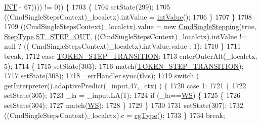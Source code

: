 \begin{DoxyCode}
      \hyperlink{classgov_1_1nasa_1_1jpf_1_1inspector_1_1client_1_1parser_1_1_console_grammar_parser_abd77a1befc3eca91ef4ffb5856126df5}{INT} - 67)))) != 0)) \{
1703           \{
1704           setState(299);
1705           ((CmdSingleStepsContext)\_localctx).intValue = \hyperlink{classgov_1_1nasa_1_1jpf_1_1inspector_1_1client_1_1parser_1_1_console_grammar_parser_a132b5d5236398d90d8d1e6b16dc0bd20}{intValue}();
1706           \}
1707         \}
1708 
1709          ((CmdSingleStepsContext)\_localctx).value =  \textcolor{keyword}{new} \hyperlink{classgov_1_1nasa_1_1jpf_1_1inspector_1_1client_1_1commands_1_1_cmd_single_stepping}{CmdSingleStepping}(\textcolor{keyword}{true}, 
      \hyperlink{enumgov_1_1nasa_1_1jpf_1_1inspector_1_1interfaces_1_1_commands_interface_1_1_step_type}{StepType}.\hyperlink{enumgov_1_1nasa_1_1jpf_1_1inspector_1_1interfaces_1_1_commands_interface_1_1_step_type_aa1a566d7ef680bc49ccaa4f710384a7b}{ST\_STEP\_OUT},      ((CmdSingleStepsContext)\_localctx).intValue != null ? ((
      CmdSingleStepsContext)\_localctx).intValue.value : 1); 
1710         \}
1711         \textcolor{keywordflow}{break};
1712       \textcolor{keywordflow}{case} \hyperlink{classgov_1_1nasa_1_1jpf_1_1inspector_1_1client_1_1parser_1_1_console_grammar_parser_adc81516f2fc9313baa559cafe7ea5c79}{TOKEN\_STEP\_TRANSITION}:
1713         enterOuterAlt(\_localctx, 5);
1714         \{
1715         setState(303);
1716         match(\hyperlink{classgov_1_1nasa_1_1jpf_1_1inspector_1_1client_1_1parser_1_1_console_grammar_parser_adc81516f2fc9313baa559cafe7ea5c79}{TOKEN\_STEP\_TRANSITION});
1717         setState(308);
1718         \_errHandler.sync(\textcolor{keyword}{this});
1719         \textcolor{keywordflow}{switch} ( getInterpreter().adaptivePredict(\_input,47,\_ctx) ) \{
1720         \textcolor{keywordflow}{case} 1:
1721           \{
1722           setState(305);
1723           \_la = \_input.LA(1);
1724           \textcolor{keywordflow}{if} (\_la==\hyperlink{classgov_1_1nasa_1_1jpf_1_1inspector_1_1client_1_1parser_1_1_console_grammar_parser_a6914a3a3adbc350b12a7df9d1b24abf1}{WS}) \{
1725             \{
1726             setState(304);
1727             match(\hyperlink{classgov_1_1nasa_1_1jpf_1_1inspector_1_1client_1_1parser_1_1_console_grammar_parser_a6914a3a3adbc350b12a7df9d1b24abf1}{WS});
1728             \}
1729           \}
1730 
1731           setState(307);
1732           ((CmdSingleStepsContext)\_localctx).c = \hyperlink{classgov_1_1nasa_1_1jpf_1_1inspector_1_1client_1_1parser_1_1_console_grammar_parser_ae6e3125de4230c77d8a95cd8064e96d7}{cgType}();
1733           \}
1734           \textcolor{keywordflow}{break};

\end{DoxyCode}
